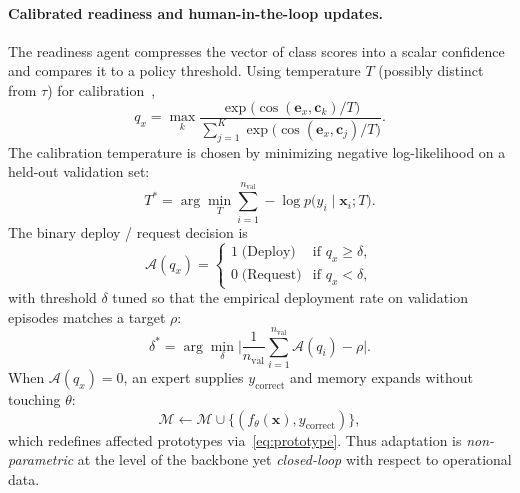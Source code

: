 \documentclass[12pt,a4paper]{report}
\begin{document}
\paragraph{Calibrated readiness and human-in-the-loop updates.}
The readiness agent compresses the vector of class scores into a scalar confidence and compares it to a policy threshold. Using temperature $T$ (possibly distinct from $\tau$) for calibration~\cite{r5},
\begin{equation}
  q_x = \max_k \frac{\exp\bigl(\cos(\mathbf{e}_x, \mathbf{c}_k)/T\bigr)}{\sum_{j=1}^{K} \exp\bigl(\cos(\mathbf{e}_x, \mathbf{c}_j)/T\bigr)}.
  \label{eq:calibration}
\end{equation}
The calibration temperature is chosen by minimizing negative log-likelihood on a held-out validation set:
\begin{equation}
  T^\ast = \arg\min_T \sum_{i=1}^{n_{\mathrm{val}}} -\log p\bigl(y_i \mid \mathbf{x}_i; T\bigr).
  \label{eq:temperature_opt}
\end{equation}
The binary deploy / request decision is
\begin{equation}
  \mathcal{A}(q_x) =
  \begin{cases}
    1 \;\text{(Deploy)} & \text{if } q_x \ge \delta,\\
    0 \;\text{(Request)} & \text{if } q_x < \delta,
  \end{cases}
  \label{eq:decision}
\end{equation}
with threshold $\delta$ tuned so that the empirical deployment rate on validation episodes matches a target $\rho$:
\begin{equation}
  \delta^\ast = \arg\min_{\delta} \Biggl| \frac{1}{n_{\mathrm{val}}} \sum_{i=1}^{n_{\mathrm{val}}} \mathcal{A}(q_i) - \rho \Biggr|.
  \label{eq:threshold_opt}
\end{equation}
When $\mathcal{A}(q_x)=0$, an expert supplies $y_{\mathrm{correct}}$ and memory expands without touching $\theta$:
\begin{equation}
  \mathcal{M} \leftarrow \mathcal{M} \cup \{(f_\theta(\mathbf{x}), y_{\mathrm{correct}})\},
  \label{eq:memory_update}
\end{equation}
which redefines affected prototypes via~\eqref{eq:prototype}. Thus adaptation is \emph{non-parametric} at the level of the backbone yet \emph{closed-loop} with respect to operational data.
\end{document}
